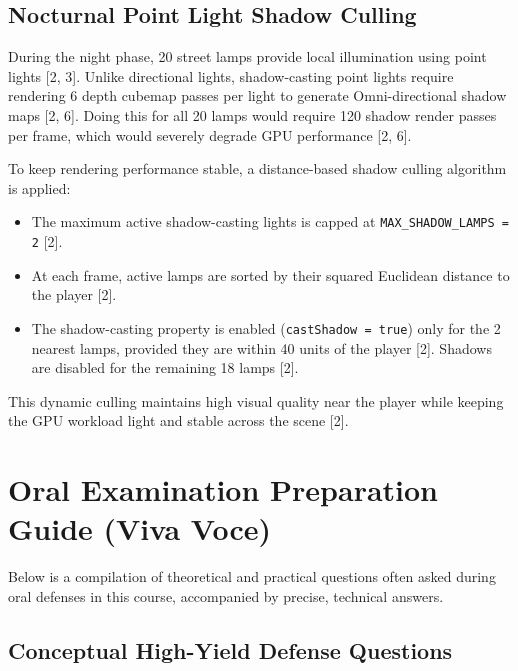 \documentclass[11pt,a4paper,oneside]{article}
\begin{document}
\subsection{Nocturnal Point Light Shadow Culling}
During the night phase, 20 street lamps provide local illumination using point lights [2, 3]. Unlike directional lights, shadow-casting point lights require rendering 6 depth cubemap passes per light to generate Omni-directional shadow maps [2, 6]. Doing this for all 20 lamps would require 120 shadow render passes per frame, which would severely degrade GPU performance [2, 6].

To keep rendering performance stable, a distance-based shadow culling algorithm is applied:
\begin{itemize}
    \item The maximum active shadow-casting lights is capped at \texttt{MAX\_SHADOW\_LAMPS = 2} [2].
    \item At each frame, active lamps are sorted by their squared Euclidean distance to the player [2].
    \item The shadow-casting property is enabled (\texttt{castShadow = true}) only for the 2 nearest lamps, provided they are within 40 units of the player [2]. Shadows are disabled for the remaining 18 lamps [2].
\end{itemize}
This dynamic culling maintains high visual quality near the player while keeping the GPU workload light and stable across the scene [2].

\newpage
\section{Oral Examination Preparation Guide (Viva Voce)}
Below is a compilation of theoretical and practical questions often asked during oral defenses in this course, accompanied by precise, technical answers.

\subsection{Conceptual High-Yield Defense Questions}
\end{document}
